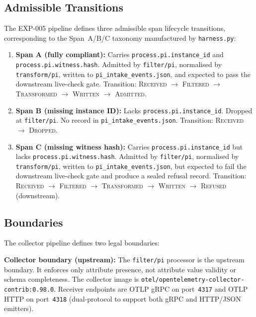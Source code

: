 \subsection{Admissible Transitions}
\label{sec:otel-weaver-exp-005-collector-to-intake-architecture-transitions}

The EXP-005 pipeline defines three admissible span lifecycle transitions, corresponding to
the Span~A/B/C taxonomy manufactured by \texttt{harness.py}:

\begin{enumerate}
  \item \textbf{Span A (fully compliant):} Carries \texttt{process.pi.instance\_id} and
        \texttt{process.pi.witness.hash}. Admitted by \texttt{filter/pi}, normalised by
        \texttt{transform/pi}, written to \texttt{pi\_intake\_events.json}, and expected to
        pass the downstream live-check gate. Transition: \textsc{Received} $\to$
        \textsc{Filtered} $\to$ \textsc{Transformed} $\to$ \textsc{Written} $\to$
        \textsc{Admitted}.

  \item \textbf{Span B (missing instance ID):} Lacks \texttt{process.pi.instance\_id}.
        Dropped at \texttt{filter/pi}. No record in \texttt{pi\_intake\_events.json}.
        Transition: \textsc{Received} $\to$ \textsc{Dropped}.

  \item \textbf{Span C (missing witness hash):} Carries \texttt{process.pi.instance\_id} but
        lacks \texttt{process.pi.witness.hash}. Admitted by \texttt{filter/pi}, normalised by
        \texttt{transform/pi}, written to \texttt{pi\_intake\_events.json}, but expected to
        fail the downstream live-check gate and produce a sealed refusal record. Transition:
        \textsc{Received} $\to$ \textsc{Filtered} $\to$ \textsc{Transformed} $\to$
        \textsc{Written} $\to$ \textsc{Refused} (downstream).
\end{enumerate}

\subsection{Boundaries}
\label{sec:otel-weaver-exp-005-collector-to-intake-architecture-boundaries}

The collector pipeline defines two legal boundaries:

\textbf{Collector boundary (upstream):} The \texttt{filter/pi} processor is the upstream
boundary. It enforces only attribute presence, not attribute value validity or schema
completeness. The collector image is
\texttt{otel/opentelemetry-collector-contrib:0.98.0}. Receiver endpoints are OTLP gRPC
on port~\texttt{4317} and OTLP HTTP on port~\texttt{4318} (dual-protocol to support both
gRPC and HTTP/JSON emitters).

